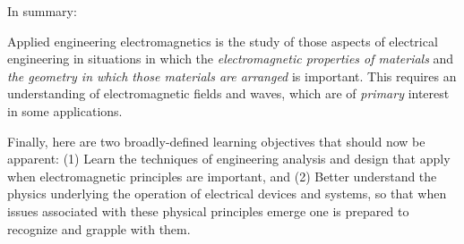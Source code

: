 In summary:
%
\begin{mdframed}[backgroundcolor=yellow!20] 
Applied engineering electromagnetics is the study of those aspects of electrical engineering in situations in which the \emph{electromagnetic properties of materials} and \emph{the geometry in which those materials are arranged} is important.  This requires an understanding of electromagnetic fields and waves, which are of \emph{primary} interest in some applications.   
\end{mdframed}

Finally, here are two broadly-defined learning objectives that should now be apparent:
(1) Learn the techniques of engineering analysis and design that apply when electromagnetic principles are important, and
(2) Better understand the physics underlying the operation of electrical devices and systems, so that when issues associated with these physical principles emerge one is prepared to recognize and grapple with them. 

